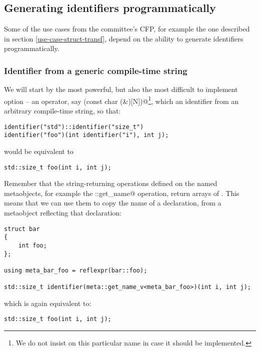 \subsection{Generating identifiers programmatically}
\label{fut-ident-gen}

Some of the use cases from the committee's CFP, for example the one described
in section \ref{use-case-struct-transf}, depend on the ability to generate
identifiers programmatically.

\subsubsection{Identifier from a generic compile-time string}
\label{fut-op-identifier1}

We will start by the most powerful, but also the most difficult to implement
option -- an operator, say \verb@identifier(const char (&)[N])@\footnote{We
do not insist on this particular name in case it should be implemented.},
which  an identifier from an arbitrary compile-time string, so that:

\begin{verbatim}
identifier("std")::identifier("size_t")
identifier("foo")(int identifier("i"), int j);
\end{verbatim}

would be equivalent to 

\begin{verbatim}
std::size_t foo(int i, int j);
\end{verbatim}

Remember that the string-returning operations defined on the named metaobjects,
for example the \verb@meta::get_name@ operation, return \verb@constexpr@
arrays of \verb@char@s. This means that we can use them to copy the name of
a declaration, from a metaobject reflecting that declaration:

\begin{verbatim}
struct bar
{
	int foo;
};

using meta_bar_foo = reflexpr(bar::foo);

std::size_t identifier(meta::get_name_v<meta_bar_foo>)(int i, int j);
\end{verbatim}

which is again equivalent to:

\begin{verbatim}
std::size_t foo(int i, int j);
\end{verbatim}

